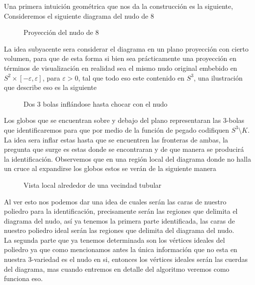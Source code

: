 Una primera intuición geométrica que nos da la construcción es la siguiente, Consideremos el siguiente diagrama del nudo de 8
\begin{figure}[H]
    \centering
    
    \caption{Proyección del nudo de 8}
\end{figure}
La idea subyacente sera considerar el diagrama en un plano proyección con cierto volumen, para que de esta forma si bien sea prácticamente una proyección en términos de visualización en realidad sea el mismo nudo original embebido en $S^2\times[-\varepsilon,\varepsilon]$, para $\varepsilon>0$, tal que todo eso este contenido en $S^3$, una ilustración que describe eso es la siguiente
\begin{figure}[H]
    \centering
    
    \caption{Dos 3 bolas inflándose hasta chocar con el nudo}
\end{figure}
Los globos que se encuentran sobre y debajo del plano representaran las 3-bolas que identificaremos para que por medio de la función de pegado codifiquen $S^3\setminus K$. La idea sera inflar estas hasta que se encuentren las fronteras de ambas, la pregunta que surge es estas donde se encontraran y de que manera se producirá la identificación. Observemos que en una región local del diagrama donde no halla un cruce al expandirse los globos estos se verán de la siguiente manera
\begin{figure}[H]
    \centering
    
    \caption{Vista local alrededor de una vecindad tubular}
\end{figure}
Al ver esto nos podemos dar una idea de cuales serán las caras de nuestro poliedro para la identificación, precisamente serán las regiones que delimita el diagrama del nudo, así ya tenemos la primera parte identificada, las caras de nuestro poliedro ideal serán las regiones que delimita del diagrama del nudo.\\

La segunda parte que ya tenemos determinada son los vértices ideales del poliedro ya que como mencionamos antes la única información que no esta en nuestra 3-variedad es el nudo en si, entonces los vértices ideales serán las cuerdas del diagrama, mas cuando entremos en detalle del algoritmo veremos como funciona eso.\\

